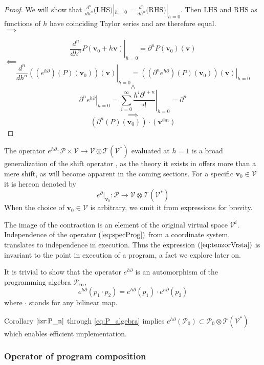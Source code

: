 \documentclass[smallcondensed]{svjour3}
\newcommand{\T}{\mathcal{T}}
\newcommand{\VV}{\mathcal{V}}
\newcommand{\vv}{\mathbf{v}}
\newcommand{\dP}{\mathcal{P}}
\newcommand{\D}{\partial}
\begin{document}
 \begin{proof}
We will show that $\frac{d^n}{dh^n}\text{(LHS)}|_{h=0}=\frac{d^n}{dh^n}\text{(RHS)}|_{h=0}$. Then $\text{LHS}$ and $\text{RHS}$ as functions
of $h$ have coinciding Taylor series and are therefore equal.\\
 $\implies$
 
 $$\left. \frac{d^n}{dh^n}P(\vv_0+h\vv)\right|_{h=0}=\D^n P(\vv_0)(\vv)$$
 $\impliedby$
 $$\left. \frac{d^n}{dh^n}\left((e^{h\D})(P)(\vv_0)\right)(\vv)\right|_{h=0}=
\left. \left((\D^n e^{h\D})(P)(\vv_0)\right)(\vv)\right|_{h=0}$$
 $$\land$$
 $$\left. \D^ne^{h\D}\right| _{h=0}=\left. \sum\limits_{i=0}^{\infty}\frac{h^i\D^{i+n}}{i!}\right|_{h=0}=\D^n$$
 $$\implies$$
 $$\left(\D^n(P)(\vv_0)\right)\cdot(\vv^{\otimes n})$$
 \end{proof}
 \begin{remark}\label{rmrk:genShift}
 The operator $e^{h\D}:\dP\times \VV\to \VV\otimes \T(\VV^*)$ evaluated at $h=1$ is a broad generalization of the shift operator \cite{OpCalc}, as the theory it exists in offers more than a mere shift, as will become apparent in the coming sections.
 For a specific $\vv_0\in\VV$ it is hereon denoted by
 \begin{equation}
 e^\D\vert_{\vv_0}:\dP\to \VV\otimes \T(\VV^*)
 \end{equation}
 When the choice of $\vv_0\in\VV$ is arbitrary, we omit it from expressions for brevity.
 \end{remark}
 
 The image of the contraction is an element of the original virtual space $\VV^i$. Independence of the operator $(\ref{eq:specProg})$ from a coordinate system, translates to independence in execution. Thus the expression $(\ref{eq:tenzorVrsta})$ is invariant to the point in execution of a program, a fact we explore later on.  
 
 It is trivial to show that the operator $e^{h\D}$ is an automorphism of the programming algebra $\dP_\infty$,
\begin{equation}\label{eq:prod}
 	e^{h\D}(p_1\cdot p_2)=e^{h\D}(p_1)\cdot e^{h\D}(p_2)
 \end{equation}
 where $\cdot$ stands for any bilinear map.
 
 Corollary $\ref{izr:P_n}$ through \eqref{eq:P_algebra} implies
      	$e^{h\D}(\dP_0)\subset\dP_0\otimes \T(\VV^*)$      
 which enables efficient implementation. 
  
 \subsubsection{Operator of program composition}\label{sec:compsition}
 
\end{document}
